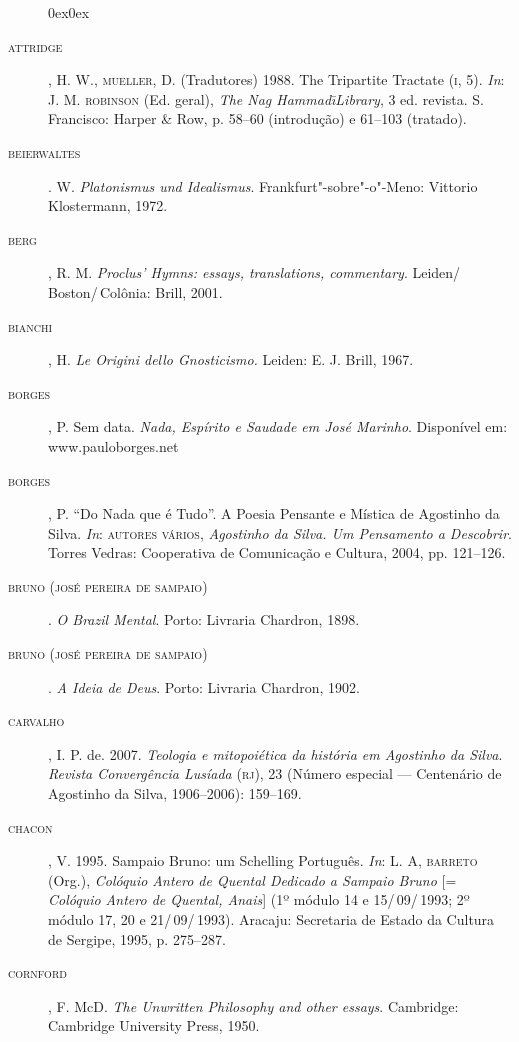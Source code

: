 \begin{description}0ex\parsep0ex
\newcommand{\tit}[1]{\item[\textnormal{\textsc{\MakeTextLowercase{#1}}}]}
\newcommand{\titidem}{\item[\line(1,0){25}]}

\tit{ATTRIDGE}, H. W., \textsc{mueller}, D. (Tradutores) 1988. The Tripartite
Tractate (\textsc{i}, 5). \emph{In}: J. M. \textsc{robinson} (Ed. geral),
\textit{The Nag Hammad\=\i Library}, 3 ed. revista. S.
Francisco: Harper \& Row, p. 58--60 (introdução) e 61--103
(tratado).

\tit{BEIERWALTES}. W. \textit{Platonismus und Idealismus}.
Frankfurt"-sobre"-o"-Meno: Vittorio Klostermann, 1972.

\tit{BERG}, R. M. \textit{Proclus' Hymns: essays, translations,
commentary}. Leiden/\,Boston/\,Colônia: Brill, 2001.

\tit{BIANCHI}, H. \textit{Le Origini dello Gnosticismo.} Leiden: E. J.
Brill, 1967.

\tit{BORGES}, P. Sem data. \textit{Nada, Espírito e Saudade em José
Marinho}. Disponível em: www.pauloborges.net

\tit{BORGES}, P. “Do Nada que é Tudo”. A Poesia Pensante e Mística de
Agostinho da Silva. \emph{In}: \textsc{autores} \textsc{vários},
\textit{Agostinho da Silva. Um Pensamento a Descobrir}. Torres
Vedras: Cooperativa de Comunicação e Cultura, 2004, pp. 121--126.

\tit{BRUNO (José Pereira de Sampaio)}. \textit{O Brazil Mental}. Porto:
Livraria Chardron, 1898.

\tit{BRUNO (José Pereira de Sampaio)}. \textit{A Ideia de Deus}. Porto:
Livraria Chardron, 1902.

\tit{CARVALHO}, I. P. de. 2007. \textit{Teologia e mitopoiética da
história em Agostinho da Silva}. \emph{Revista Convergência
Lusíada} (\textsc{rj}), 23 (Número especial --- Centenário de Agostinho da
Silva, 1906--2006): 159--169.

\tit{CHACON}, V. 1995. Sampaio Bruno: um Schelling Português.
\emph{In}: L. A, \textsc{barreto} (Org.), \textit{Colóquio Antero de
Quental Dedicado a Sampaio Bruno} [= \textit{Colóquio Antero de
Quental, Anais}] (1º módulo 14 e 15/\,09/\,1993; 2º módulo 17, 20 e
21/\,09/\,1993). Aracaju: Secretaria de Estado da Cultura de
Sergipe, 1995, p. 275--287.

\tit{CORNFORD}, F. McD. \textit{The Unwritten Philosophy and other
essays}. Cambridge: Cambridge University Press, 1950.


\end{description}
